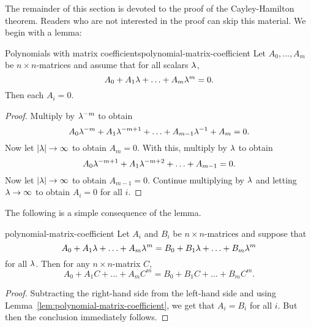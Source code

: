 The remainder of this section is devoted to the proof of the
Cayley-Hamilton theorem. Readers who are not interested in the proof
can skip this material. We begin with a lemma:

\begin{lemma}{Polynomials with matrix coefficients}{polynomial-matrix-coefficient}
  Let $A_0,\ldots,A_m$ be $n\times n$-matrices and assume that for all
  scalars $\lambda$,
  \begin{equation*}
    A_0 + A_1\lambda + \ldots + A_m\lambda^m = 0.
  \end{equation*}
  Then each $A_i = 0$.
\end{lemma}

\begin{proof}
  Multiply by $\lambda^{-m}$ to obtain
  \begin{equation*}
    A_0 \lambda^{-m} + A_1 \lambda^{-m+1} + \ldots + A_{m-1}\lambda^{-1} + A_m = 0.
  \end{equation*}
  Now let $\left|\lambda\right|\rightarrow\infty$ to obtain $A_m = 0$. With
  this, multiply by $\lambda$ to obtain
  \begin{equation*}
    A_0 \lambda^{-m+1} + A_1 \lambda^{-m+2} + \ldots + A_{m-1} = 0.
  \end{equation*}
  Now let $\left|\lambda\right|\rightarrow\infty$ to obtain $A_{m-1} =
  0$. Continue multiplying by $\lambda$ and letting
  $\lambda\to\infty$ to obtain $A_i=0$ for all $i$.
\end{proof}

The following is a simple consequence of the lemma.

\begin{corollary}{}{polynomial-matrix-coefficient}
  Let $A_i$ and $B_i$ be $n\times n$-matrices and suppose that
  \begin{equation*}
    A_0 + A_1\lambda + \ldots + A_m\lambda^m =
    B_0 + B_1\lambda + \ldots + B_m\lambda^m
  \end{equation*}
  for all $\lambda$. Then for any $n\times n$-matrix $C$,
  \begin{equation*}
    A_0 + A_1C + \ldots + A_mC^m =
    B_0 + B_1C + \ldots + B_mC^m.
  \end{equation*}
\end{corollary}

\begin{proof}
  Subtracting the right-hand side from the left-hand side and using
  Lemma~\ref{lem:polynomial-matrix-coefficient}, we get that $A_i=B_i$
  for all $i$. But then the conclusion immediately follows.
\end{proof}

